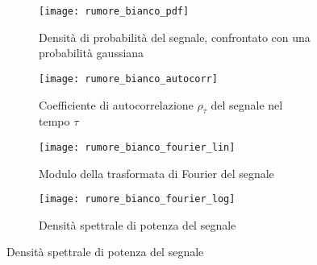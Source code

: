 \documentclass{article} %
\begin{document}
\begin{figure}[ht!]
	\begin{subfigure}{0.5\textwidth}
		\texttt{[image: rumore\_bianco\_pdf]}
		\caption{Densità di probabilità del segnale, confrontato con una probabilità gaussiana}
	\end{subfigure}
	\begin{subfigure}{0.5\textwidth}
		\texttt{[image: rumore\_bianco\_autocorr]}
		\caption{Coefficiente di autocorrelazione $\rho_{\tau}$ del segnale nel tempo $\tau$}
	\end{subfigure}
	\begin{subfigure}{0.5\textwidth}
		\texttt{[image: rumore\_bianco\_fourier\_lin]}
		\caption{Modulo della trasformata di Fourier del segnale}
	\end{subfigure}
	\begin{subfigure}{0.5\textwidth}
		\texttt{[image: rumore\_bianco\_fourier\_log]}
		\caption{Densità spettrale di potenza del segnale}
	\end{subfigure}
\end{figure}
\newpage
\end{document}
